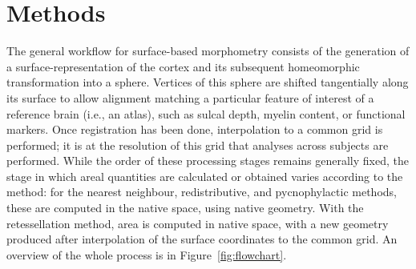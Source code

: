 \section{Methods}
\label{sec:cortex:methods}

The general workflow for surface-based morphometry consists of the generation of a surface-representation of the cortex and its subsequent homeomorphic transformation into a sphere. Vertices of this sphere are shifted tangentially along its surface to allow alignment matching a particular feature of interest of a reference brain (i.e., an atlas), such as sulcal depth, myelin content, or functional markers. Once registration has been done, interpolation to a common grid is performed; it is at the resolution of this grid that analyses across subjects are performed. While the order of these processing stages remains generally fixed, the stage in which areal quantities are calculated or obtained varies according to the method: for the nearest neighbour, redistributive, and pycnophylactic methods, these are computed in the native space, using native geometry. With the retessellation method, area is computed in native space, with a new geometry produced after interpolation of the surface coordinates to the common grid. An overview of the whole process is in Figure~\ref{fig:flowchart}.

